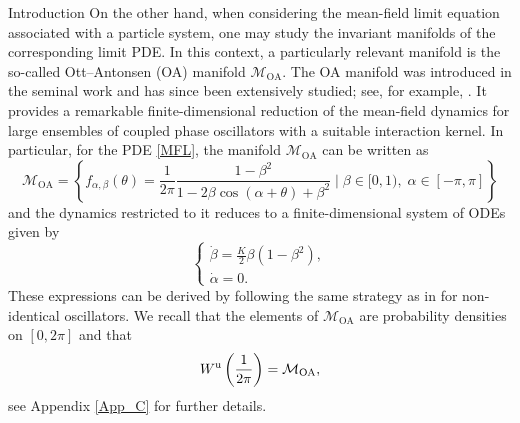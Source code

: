 \documentclass{article}
\theoremstyle{definition}
\renewcommand{\u}{\textnormal{u}}
\newcommand{\OA}{\mathcal{M}_{\mathrm{OA}}}
\begin{document}
\begin{section}{Introduction}
On the other hand, when considering the mean-field limit equation associated with a particle system, one may study the invariant manifolds of the corresponding limit PDE. In this context, a particularly relevant manifold is the so-called Ott--Antonsen (OA) manifold $\OA$. The OA manifold was introduced in the seminal work \cite{ott2008low} and has since been extensively studied; see, for example, \cite{tyulkina2018dynamics,ott2009long,engelbrecht2020ott,martens2009exact}. It provides a remarkable finite-dimensional reduction of the mean-field dynamics for large ensembles of coupled phase oscillators with a suitable interaction kernel. In particular, for the PDE \eqref{MFL}, the manifold $\OA$ can be written as
\begin{equation}\label{OA_Man}
    \OA=\left\{f_{\alpha,\beta}(\theta)=\frac{1}{2\pi}\frac{1-\beta^2}{1-2\beta\cos(\alpha+\theta)+\beta^2}\;\bigg\vert\;\beta\in[0,1),\;\alpha\in[-\pi,\pi]\right\}
\end{equation}
and the dynamics restricted to it reduces to a finite-dimensional system of ODEs given by
\begin{equation}\label{red_dyn_OA}
    \begin{cases}
        \dot{\beta}=\frac{K}{2}\beta(1-\beta^2),\\
        \dot{\alpha}=0.
    \end{cases}
\end{equation}
These expressions can be derived by following the same strategy as in \cite{ott2008low} for non-identical oscillators. We recall that the elements of $\OA$ are probability densities on $[0,2\pi]$ and that
$$W^\u\left(\frac{1}{2\pi}\right)=\OA,$$
see Appendix \ref{App_C} for further details.\\


\end{section}
\end{document}
